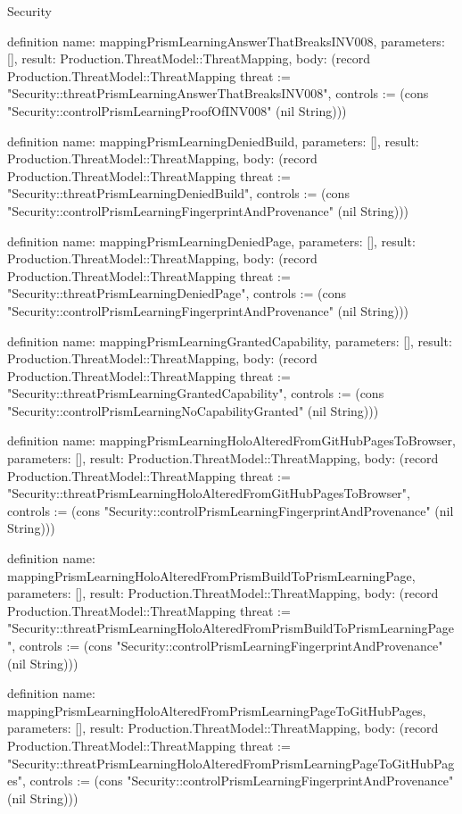 \begin{lexlean}{Security}
\begin{semanticmodule}
definition{
  name: mappingPrismLearningAnswerThatBreaksINV008,
  parameters: [],
  result: Production.ThreatModel::ThreatMapping,
  body: (record Production.ThreatModel::ThreatMapping {threat := "Security::threatPrismLearningAnswerThatBreaksINV008", controls := (cons "Security::controlPrismLearningProofOfINV008" (nil String))})
}

definition{
  name: mappingPrismLearningDeniedBuild,
  parameters: [],
  result: Production.ThreatModel::ThreatMapping,
  body: (record Production.ThreatModel::ThreatMapping {threat := "Security::threatPrismLearningDeniedBuild", controls := (cons "Security::controlPrismLearningFingerprintAndProvenance" (nil String))})
}

definition{
  name: mappingPrismLearningDeniedPage,
  parameters: [],
  result: Production.ThreatModel::ThreatMapping,
  body: (record Production.ThreatModel::ThreatMapping {threat := "Security::threatPrismLearningDeniedPage", controls := (cons "Security::controlPrismLearningFingerprintAndProvenance" (nil String))})
}

definition{
  name: mappingPrismLearningGrantedCapability,
  parameters: [],
  result: Production.ThreatModel::ThreatMapping,
  body: (record Production.ThreatModel::ThreatMapping {threat := "Security::threatPrismLearningGrantedCapability", controls := (cons "Security::controlPrismLearningNoCapabilityGranted" (nil String))})
}

definition{
  name: mappingPrismLearningHoloAlteredFromGitHubPagesToBrowser,
  parameters: [],
  result: Production.ThreatModel::ThreatMapping,
  body: (record Production.ThreatModel::ThreatMapping {threat := "Security::threatPrismLearningHoloAlteredFromGitHubPagesToBrowser", controls := (cons "Security::controlPrismLearningFingerprintAndProvenance" (nil String))})
}

definition{
  name: mappingPrismLearningHoloAlteredFromPrismBuildToPrismLearningPage,
  parameters: [],
  result: Production.ThreatModel::ThreatMapping,
  body: (record Production.ThreatModel::ThreatMapping {threat := "Security::threatPrismLearningHoloAlteredFromPrismBuildToPrismLearningPage", controls := (cons "Security::controlPrismLearningFingerprintAndProvenance" (nil String))})
}

definition{
  name: mappingPrismLearningHoloAlteredFromPrismLearningPageToGitHubPages,
  parameters: [],
  result: Production.ThreatModel::ThreatMapping,
  body: (record Production.ThreatModel::ThreatMapping {threat := "Security::threatPrismLearningHoloAlteredFromPrismLearningPageToGitHubPages", controls := (cons "Security::controlPrismLearningFingerprintAndProvenance" (nil String))})
}


\end{semanticmodule}
\end{lexlean}
